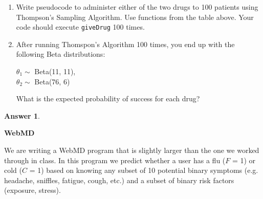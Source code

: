 \documentclass[12pt]{article}
\renewcommand{\(}{\left(}
\renewcommand{\)}{\right)}
\theoremstyle{definition}
\newtheorem*{answer}{Answer}
\begin{document}
\begin{enumerate}
{\begin{enumerate}
        \item Write pseudocode to administer either of the two drugs to 100 patients using Thompson's Sampling Algorithm. Use functions from the table above. Your code should execute \texttt{giveDrug} 100 times.
        \item After running Thomspon's Algorithm 100 times, you end up with the following Beta distributions:
        \begin{center}
            $\theta_1 \sim$ Beta(11, 11),\\
            $\theta_2 \sim $ Beta(76, 6)
        \end{center}
        What is the expected probability of success for each drug?
    \end{enumerate}
    
    \begin{shaded}
    \begin{answer}
    
    \end{answer}
    \end{shaded}
    \newpage
    
    \textbf{WebMD}
    \item We are writing a WebMD program that is slightly larger than the one we worked through in class. In this program we predict whether a user has a flu ($F$ = 1) or cold ($C$ = 1) based on knowing any subset of 10 potential binary symptoms (e.g. headache, sniffles, fatigue, cough, etc.) and a subset of binary risk factors (exposure, stress).\\
    }
\end{enumerate}
\end{document}

